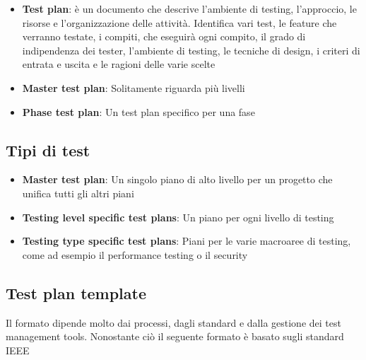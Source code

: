 \documentclass[11pt,a4paper]{book}
\begin{document}
\begin{itemize}
	\item \textbf{Test plan}: è un documento che descrive l'ambiente di testing, l'approccio, le risorse e l'organizzazione delle attività. Identifica vari test, le feature che verranno testate, i compiti, che eseguirà ogni compito, il grado di indipendenza dei tester, l'ambiente di testing, le tecniche di design, i criteri di entrata e uscita e le ragioni delle varie scelte
	\item \textbf{Master test plan}: Solitamente riguarda più livelli
	\item \textbf{Phase test plan}: Un test plan specifico per una fase
\end{itemize}

\subsection{Tipi di test}
\begin{itemize}
	\item \textbf{Master test plan}: Un singolo piano di alto livello per un progetto che unifica tutti gli altri piani
	\item \textbf{Testing level specific test plans}: Un piano per ogni livello di testing
	\item \textbf{Testing type specific test plans}: Piani per le varie macroaree di testing, come ad esempio il performance testing o il security
\end{itemize}

\subsection{Test plan template}
Il formato dipende molto dai processi, dagli standard e dalla gestione dei test management tools. Nonostante ciò il seguente formato è basato sugli standard IEEE
\end{document}
